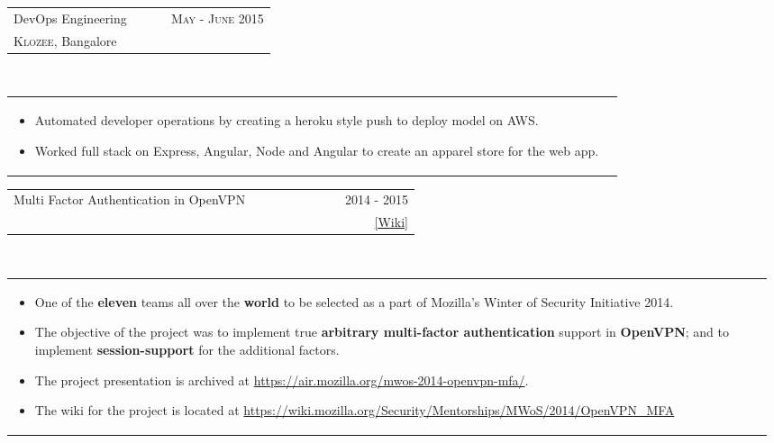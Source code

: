 \documentclass[a4paper]{article} %
\newcommand{\verticalspacing}{-0.25cm}
\newcommand{\bulletspace}{0.7cm}
\newcommand{\projectheadspacing}{6.9cm}
\newcommand{\cproject}[5]{%
    \begin{tabular}{p{0.60\linewidth}r}
        \textcolor{NavyBlue}{\small #2} & \multicolumn{1}{m{ \projectheadspacing{} }}{\raggedleft \small {\textsc{#1}}}\\
        \small {#3} & \small {#4}
    \end{tabular}\\
    \begin{tabular}{p{0.98\linewidth}}
    \vspace{-0.3cm}
        \small{#5}
    \end{tabular}
    \vspace{\verticalspacing{}}
}
\begin{document}
\cproject
      {May - June 2015}
      {DevOps Engineering}
      {\textsc{Klozee}, Bangalore}
      {}
      {%
        \begin{itemize}[leftmargin=\bulletspace{}]
          \item Automated developer operations by creating a heroku style push to deploy model on AWS.
          \item Worked full stack on Express, Angular, Node and Angular to create an apparel store for the web app.
        \end{itemize}
      }

\cproject
    {2014 - 2015}
    {Multi Factor Authentication in OpenVPN}
    {\textsc{\raggedright Mozilla Winter of Security}, Guillaume Destuynder, Professor Dheeraj Sanghi}
    {\href{https://wiki.mozilla.org/Security/Mentorships/MWoS/2014/OpenVPN\_MFA} {[Wiki]} }
    {%
        \begin{itemize}[leftmargin=\bulletspace{}]
          \item One of the \textbf{eleven} teams all over the \textbf{world} to be selected as a part of Mozilla's Winter of Security Initiative 2014.
          \item The objective of the project was to implement true \textbf{arbitrary multi-factor authentication} support in
              \textbf{OpenVPN}; and to implement \textbf{session-support} for the additional factors.
          \item The project presentation is archived at
              \href{https://air.mozilla.org/mwos-2014-openvpn-mfa/}{https://air.mozilla.org/mwos-2014-openvpn-mfa/}.
          \item The wiki for the project is located at \href{https://wiki.mozilla.org/Security/Mentorships/MWoS/2014/OpenVPN\_MFA} {https://wiki.mozilla.org/Security/Mentorships/MWoS/2014/OpenVPN\_MFA}
      \end{itemize}
    }


\end{document}

